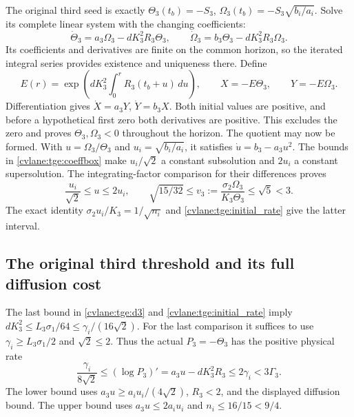 The original third seed is exactly
$\Theta_3(t_b)=-S_3$, $\Omega_3(t_b)=-S_3\sqrt{b_i/a_i}$.
Solve its complete linear system with the changing coefficients:
\begin{equation}\label{cvlane:tge:pair}
 \dot\Theta_3=a_3\Omega_3-dK_3^2R_3\Theta_3,
 \qquad\dot\Omega_3=b_3\Theta_3-dK_3^2R_3\Omega_3.
\end{equation}
Its coefficients and derivatives are finite on the common horizon,
so the iterated integral series provides existence and uniqueness
there. Define
\[
 E(r)=\exp\left(dK_3^2\int_0^r R_3(t_b+u)\,du\right),\qquad
 X=-E\Theta_3,\qquad Y=-E\Omega_3.
\]
Differentiation gives $\dot X=a_3Y$, $\dot Y=b_3X$.
Both initial values are positive, and before a hypothetical first zero
both derivatives are positive. This excludes the zero and proves
$\Theta_3,\Omega_3<0$ throughout the horizon. The quotient may now
be formed. With $u=\Omega_3/\Theta_3$ and $u_i=\sqrt{b_i/a_i}$,
it satisfies $\dot u=b_3-a_3u^2$. The bounds in
\eqref{cvlane:tge:coeffbox} make $u_i/\sqrt2$ a constant subsolution and
$2u_i$ a constant supersolution. The integrating-factor comparison
for their differences proves
\begin{equation}\label{cvlane:tge:quotient}
 \frac{u_i}{\sqrt2}\leq u\leq2u_i,
 \qquad \sqrt{15/32}\leq
       v_3:=\frac{\sigma_2\Omega_3}{K_3\Theta_3}\leq\sqrt5<3.
\end{equation}
The exact identity $\sigma_2u_i/K_3=1/\sqrt{n_i}$ and
\eqref{cvlane:tge:initial_rate} give the latter interval.

\subsection{The original third threshold and its full diffusion cost}

The last bound in \eqref{cvlane:tge:d3} and
\eqref{cvlane:tge:initial_rate} imply
$dK_3^2\leq L_3\sigma_1/64\leq\gamma_i/(16\sqrt2)$.
For the last comparison it suffices to use
$\gamma_i\geq L_3\sigma_1/2$ and $\sqrt2\leq2$.
Thus the actual $P_3=-\Theta_3$ has the positive physical rate
\begin{equation}\label{cvlane:tge:gain_rate}
 \frac{\gamma_i}{8\sqrt2}
 \leq(\log P_3)'=a_3u-dK_3^2R_3
 \leq2\gamma_i<3\Gamma_3.
\end{equation}
The lower bound uses $a_3u\geq a_iu_i/(4\sqrt2)$,
$R_3<2$, and the displayed diffusion bound. The upper bound
uses $a_3u\leq2a_iu_i$ and $n_i\leq16/15<9/4$.

